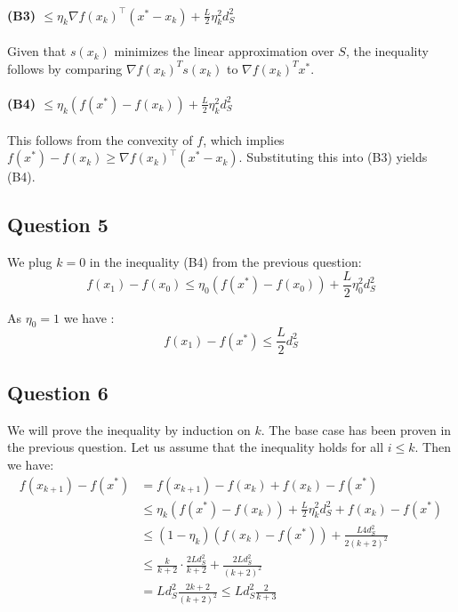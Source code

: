 \documentclass[12p]{article}
\begin{document}
\paragraph*{(B3) \( \leq \eta_k \nabla f(x_k)^\top (x^* - x_k) + \frac{L}{2} \eta_k^2 d_S^2 \)}\hfil\par
Given that \( s(x_k) \) minimizes the linear approximation over \( S \), the inequality follows by comparing \( \nabla f(x_k)^Ts(x_k) \) to \( \nabla f(x_k)^Tx^* \).

\paragraph*{(B4) \( \leq \eta_k (f(x^*) - f(x_k)) + \frac{L}{2} \eta_k^2 d_S^2 \)}\hfil\par
This follows from the convexity of \( f \), which implies \( f(x^*) - f(x_k) \geq \nabla f(x_k)^\top (x^* - x_k) \). Substituting this into (B3) yields (B4).


\subsection*{Question 5} \hfil\par

We plug \(k=0\) in the inequality (B4) from the previous question:
\[
  f(x_1)-f(x_0)\leq \eta_0(f(x^*)-f(x_0))+\frac{L}{2}\eta_0^2d_S^2
\]

As \(\eta_0=1\) we have :
\[
  f(x_1)-f(x^*)\leq \frac{L}{2}d_S^2  
\]

\subsection*{Question 6} 

We will prove the inequality by induction on \(k\). The base case has been proven in the previous question. Let us assume that the inequality holds for all \(i\leq k\). Then we have:
\begin{align*}
    f(x_{k+1})-f(x^*) &= f(x_{k+1})-f(x_k)+f(x_k)-f(x^*)\\
    &\leq \eta_k(f(x^*)-f(x_k))+\frac{L}{2}\eta_k^2d_S^2+f(x_k)-f(x^*)\\
    &\leq (1-\eta_k)(f(x_k)-f(x^*))+\frac{L4d_S^2}{2(k+2)^2}\\
    &\leq \frac{k}{k+2}\cdot \frac{2Ld_S^2}{k+2}+\frac{2Ld_S^2}{(k+2)^2}\\
    &=Ld_S^2\frac{2k+2}{(k+2)^2}\leq Ld_S^2\frac{2}{k+3}\\
\end{align*}
\end{document}
